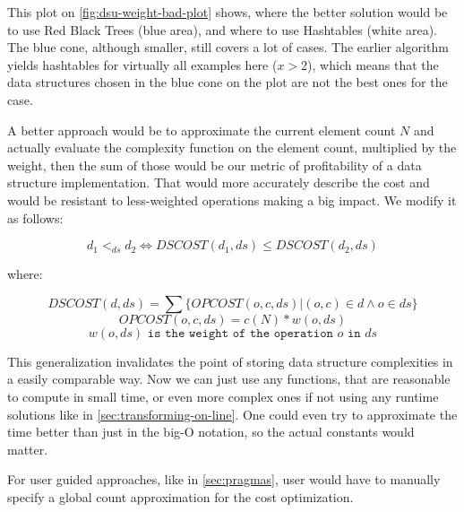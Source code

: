 \documentclass[a4paper,11pt]{article}
\begin{document}
            This plot on \autoref{fig:dsu-weight-bad-plot} shows, where the better solution would be to use Red Black
            Trees (blue area), and where to use Hashtables (white area). The blue cone, although smaller, still covers a
            lot of cases. The earlier algorithm yields hashtables for virtually all examples here ($x > 2$), which means
            that the data structures chosen in the blue cone on the plot are not the best ones for the case.

            A better approach would be to approximate the current element count $N$ and actually evaluate the complexity
            function on the element count, multiplied by the weight, then the sum of those would be our metric of
            profitability of a data structure implementation. That would more accurately describe the cost and would be
            resistant to less-weighted operations making a big impact. We modify it as follows:

            \begin{equation} \label{data-structure-order-weights}
                d_1 <_{ds} d_2 \Leftrightarrow DSCOST(d_1, ds) \leq DSCOST(d_2, ds)
            \end{equation}

            where:

            \begin{equation}
                DSCOST(d,ds) = \sum \{OPCOST(o,c,ds) | (o,c) \in d \wedge o \in ds\}
            \end{equation}
            \begin{equation}
                OPCOST(o,c,ds) = c(N) * w(o, ds)
            \end{equation}
            \begin{equation}
                w(o, ds) \texttt{ is the weight of the operation } o \texttt{ in } ds
            \end{equation}

            This generalization invalidates the point of storing data structure complexities in a easily comparable way.
            Now we can just use any functions, that are reasonable to compute in small time, or even more complex ones
            if not using any runtime solutions like in \autoref{sec:transforming-on-line}. One could even try to
            approximate the time better than just in the big-O notation, so the actual constants would matter.

            For user guided approaches, like in \autoref{sec:pragmas}, user would have to manually specify a global
            count approximation for the cost optimization.
\end{document}
